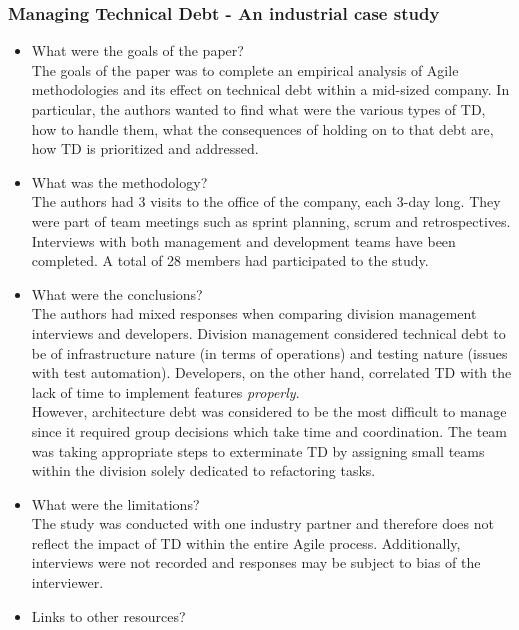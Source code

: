 \documentclass{mprop}
\begin{document}
\subsubsection{Managing Technical Debt - An industrial case study}
\cite{Codabux2013}
\begin{itemize}
	\item What were the goals of the paper? \\
	      The goals of the paper was to complete an empirical analysis of
	      Agile methodologies and its effect on technical debt within a
	      mid-sized company. In particular, the authors wanted to find what
	      were the various types of TD, how to handle them, what the
	      consequences of holding on to that debt are, how TD is prioritized
	      and addressed.
	\item What was the methodology? \\
	      The authors had 3 visits to the office of the company, each 3-day
	      long. They were part of team meetings such as sprint planning, scrum
	      and retrospectives. Interviews with both management and development
	      teams have been completed. A total of 28 members had participated to
	      the study.
	\item What were the conclusions? \\
	      The authors had mixed responses when comparing division management
	      interviews and developers. Division management considered technical
	      debt to be of infrastructure nature (in terms of operations) and
	      testing nature (issues with test automation). Developers, on the
	      other hand, correlated TD with the lack of time to implement
	      features \textit{properly}.\\
	      However, architecture debt was considered to be the most difficult
	      to manage since it required group decisions which take time and
	      coordination. The team was taking appropriate steps to exterminate
	      TD by assigning small teams within the division solely dedicated to
	      refactoring tasks.
	\item What were the limitations? \\
	      The study was conducted with one industry partner and therefore does
	      not reflect the impact of TD within the entire Agile process.
	      Additionally, interviews were not recorded and responses may be
	      subject to bias of the interviewer.
	\item Links to other resources? \\
\end{itemize}
\end{document}
